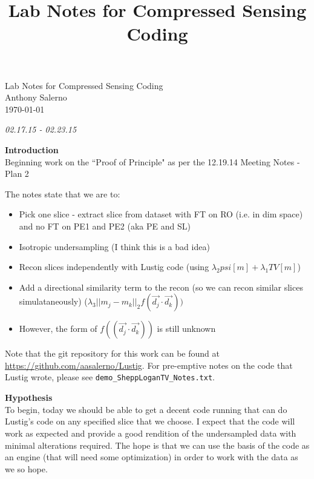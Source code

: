\documentclass[pra,11 pt]{revtex4-1}
\title{Lab Notes for Compressed Sensing Coding}
\newcommand{\bo}{\noindent\textbf}
\begin{document}
\vfill

  \begin{titlepage}
    \vspace*{\fill}
    \begin{center}
      {\huge {Lab Notes for Compressed Sensing Coding}}\\[0.5cm]
      {\large {Anthony Salerno}}\\[0.4cm]
      \today
    \end{center}
    \vspace*{\fill}
  \end{titlepage}

\clearpage
\newpage

\noindent \emph{02.17.15 - 02.23.15}

\bo{Introduction}\\
Beginning work on the ``Proof of Principle" as per the 12.19.14 Meeting Notes - Plan 2

The notes state that we are to:
\begin{itemize}
  \item Pick one slice - extract slice from dataset with FT on RO (i.e. in dim space) and no FT on PE1 and PE2 (aka PE and SL)
  \item Isotropic undersampling (I think this is a bad idea)
  \item Recon slices independently with Lustig code (using $\lambda_2 psi[m] + \lambda_1 TV[m]$)
  \item Add a directional similarity term to the recon (so we can recon similar slices simulataneously) ($\lambda_3 ||m_j - m_k||_2 f(\vec{d_j} \cdot \vec{d_k}))$
  \item However, the form of $f((\vec{d_j}\cdot \vec{d_k}))$ is still unknown
\end{itemize}

\noindent Note that the git repository for this work can be found at \url{https://github.com/aasalerno/Lustig}. For pre-emptive notes on the code that Lustig wrote, please see \verb!demo_SheppLoganTV_Notes.txt!.


\bo{Hypothesis}\\
To begin, today we should be able to get a decent code running that can do Lustig's code on any specified slice that we choose. I expect that the code will work as expected and provide a good rendition of the undersampled data with minimal alterations required. The hope is that we can use the basis of the code as an engine (that will need some optimization) in order to work with the data as we so hope.
\end{document}
